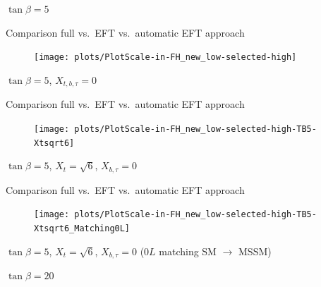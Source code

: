 \documentclass[hyperref={pdfpagelabels=false},ngerman]{beamer}
\begin{document}
\begin{frame}[noframenumbering]
  \begin{center}
    $\tan\beta = 5$
  \end{center}
\end{frame}

\begin{frame}[noframenumbering]{Comparison full vs.\ EFT vs.\ automatic EFT approach}
  \begin{figure}
    \centering
    \texttt{[image: plots/PlotScale-in-FH\_new\_low-selected-high]}
  \end{figure}
  $\tan\beta = 5$, $X_{t,b,\tau} = 0$
\end{frame}

\begin{frame}[noframenumbering]{Comparison full vs.\ EFT vs.\ automatic EFT approach}
  \begin{figure}
    \centering
    \texttt{[image: plots/PlotScale-in-FH\_new\_low-selected-high-TB5-Xtsqrt6]}
  \end{figure}
  $\tan\beta = 5$, $X_{t} = \sqrt{6}$, $X_{b,\tau} = 0$
\end{frame}

\begin{frame}[noframenumbering]{Comparison full vs.\ EFT vs.\ automatic EFT approach}
  \begin{figure}
    \centering
    \texttt{[image: plots/PlotScale-in-FH\_new\_low-selected-high-TB5-Xtsqrt6\_Matching0L]}
  \end{figure}
  $\tan\beta = 5$, $X_{t} = \sqrt{6}$, $X_{b,\tau} = 0$ ($0L$ matching SM $\rightarrow$ MSSM)
\end{frame}


\begin{frame}[noframenumbering]
  \begin{center}
    $\tan\beta = 20$
  \end{center}
\end{frame}

\end{document}
